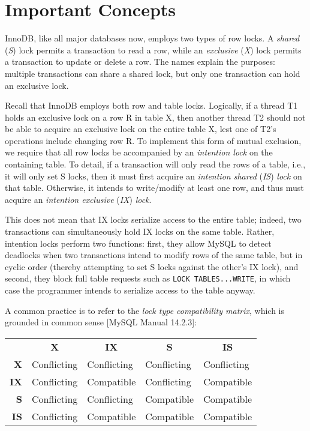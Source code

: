 \documentclass[12pt]{article} %
\begin{document}
\section{Important Concepts}
InnoDB, like all major databases now, employs two types of row locks. A \textsl{shared} (\textsl{S}) lock permits a transaction to read a row, while an \textsl{exclusive} (\textsl{X}) lock permits a transaction to update or delete a row. The names explain the purposes: multiple transactions can share a shared lock, but only one transaction can hold an exclusive lock.

Recall that InnoDB employs both row and table locks. Logically, if a thread T1 holds an exclusive lock on a row R in table X, then another thread T2 should not be able to acquire an exclusive lock on the entire table X, lest one of T2's operations include changing row R. To implement this form of mutual exclusion, we require that all row locks be accompanied by an \textsl{intention lock} on the containing table. To detail, if a transaction will only read the rows of a table, i.e., it will only set S locks, then it must first acquire an \textsl{intention shared} (\textsl{IS}) \textsl{lock} on that table. Otherwise, it intends to write/modify at least one row, and thus must acquire an \textsl{intention exclusive} (\textsl{IX}) \textsl{lock}. 

This does not mean that IX locks serialize access to the entire table; indeed, two transactions can simultaneously hold IX locks on the same table. Rather, intention locks perform two functions: first, they allow MySQL to detect deadlocks when two transactions intend to modify rows of the same table, but in cyclic order (thereby attempting to set S locks against the other's IX lock), and second, they block full table requests such as \texttt{LOCK TABLES...WRITE}, in which case the programmer intends to serialize access to the table anyway.

A common practice is to refer to the \textsl{lock type compatibility matrix}, which is grounded in common sense [MySQL Manual 14.2.3]:
\begin{table}[h]
\centering
\begin{tabular}{rllll}
\multicolumn{1}{l}{\textbf{}} & \multicolumn{1}{c}{\textbf{X}} & \multicolumn{1}{c}{\textbf{IX}} & \multicolumn{1}{c}{\textbf{S}} & \multicolumn{1}{c}{\textbf{IS}} \\
\textbf{X}                    & Conflicting                    & Conflicting                     & Conflicting                    & Conflicting                     \\
\textbf{IX}                   & Conflicting                    & Compatible                      & Conflicting                    & Compatible                      \\
\textbf{S}                    & Conflicting                    & Conflicting                     & Compatible                     & Compatible                      \\
\textbf{IS}                   & Conflicting                    & Compatible                      & Compatible                     & Compatible                     
\end{tabular}
\end{table}
\end{document}
